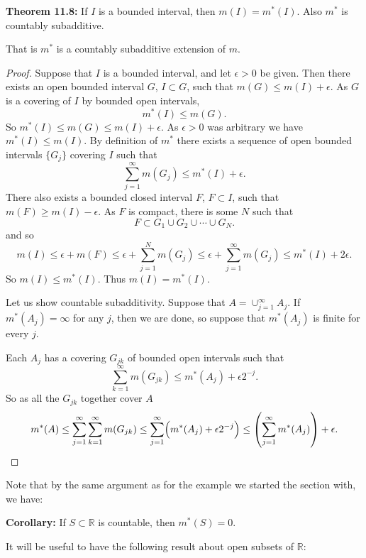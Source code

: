 \documentclass[12pt]{book}
\newcommand{\R}{{\mathbb{R}}}
\theoremstyle{plain}
\theoremstyle{remark}
\theoremstyle{definition}
\theoremstyle{exercise}
\theoremstyle{example}
\begin{document}
\medskip

\textbf{Theorem 11.8:}
If $I$ is a bounded interval, then $m(I) = m^*(I)$.  Also $m^*$ is countably subadditive.

\medskip

That is $m^*$ is a countably subadditive extension of $m$.

\medskip

\begin{proof}
Suppose that $I$ is a bounded interval, and let $\epsilon > 0$ be given.
Then there exists an open bounded interval $G$, $I \subset G$, such that
$m(G) \leq m(I) + \epsilon$.
As $G$ is a covering of $I$ by bounded open intervals,
$$
m^*(I) \leq m(G) .
$$
So $m^*(I) \leq m(G) \leq m(I) + \epsilon$.  As $\epsilon > 0$
was arbitrary we have $m^*(I) \leq m(I)$.
By definition of $m^*$ there exists a sequence
of open bounded intervals $\{ G_j \}$ covering $I$ such that
$$
\sum_{j=1}^\infty m(G_j) \leq m^*(I) + \epsilon .
$$
There also exists a bounded closed interval $F$, $F \subset I$, such that
$m(F) \geq m(I)-\epsilon$.
As $F$ is compact, there is some $N$ such that
$$
F \subset G_1 \cup G_2 \cup \cdots \cup G_N .
$$
and so
$$
m(I) \leq \epsilon+m(F) \leq \epsilon + \sum_{j=1}^N m(G_j)
\leq 
\epsilon + \sum_{j=1}^\infty m(G_j) \leq m^*(I) + 2\epsilon .
$$
So $m(I) \leq m^*(I)$.  Thus $m(I) = m^*(I)$.

\medskip

Let us show countable subadditivity.
Suppose that $A = \cup_{j=1}^\infty A_j$.
If $m^*(A_j) = \infty$ for any $j$, then we are done, so suppose that
$m^*(A_j)$ is finite for every $j$.

Each $A_j$
has a covering $G_{jk}$ of bounded open intervals such that
$$
\sum_{k=1}^\infty m(G_{jk}) \leq m^*(A_j) + \epsilon 2^{-j} .
$$
So as all the $G_{jk}$ together cover $A$
$$
m^*(A)
\leq
\sum_{j=1}^\infty
\sum_{k=1}^\infty
m(G_{jk})
\leq
\sum_{j=1}^\infty
\Bigl( m^*(A_j) + \epsilon 2^{-j} \Bigr)
\leq
\left(
\sum_{j=1}^\infty
m^*(A_j) \right)
+ \epsilon .
$$
\end{proof}

Note that by the same argument as for the example we started the section
with, we have:

\medskip

\textbf{Corollary:}
If $S \subset \R$ is countable, then $m^*(S) = 0$.

\medskip

It will be useful to have the following result about open subsets of $\R$:
\end{document}
